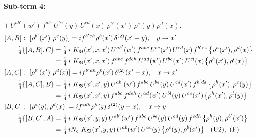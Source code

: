 \documentclass[10pt]{article}
\numberwithin{equation}{section}
\begin{document}
\paragraph{Sub-term 4:} $+\,U^{ab'}(w')\,f^{abc}\,U^{be}(y)\,U^{cd}(x)\,\rho^{b'}(x')\,\rho^{e}(y)\,\rho^{d}(x)$.
\begin{align}
&[A,B]:\ [\rho^{b'}(x'),\rho^{e}(y)]=i f^{b'eh}\rho^{h}(x')\,\delta^{(2)}(x'-y),\quad y\to x'\notag\\
&\qquad \tfrac14\{[A,B],C\}=\tfrac14\,i\,\,K_{\mathfrak B}(x',x,x')\,U^{ab'}(w')\,f^{abc}\,U^{be}(x')\,U^{cd}(x)\,f^{b'eh}\,\big\{\rho^{h}(x'),\rho^{d}(x)\big\}\notag\\
&\qquad\phantom{\tfrac14\{[A,B],C\}}=\tfrac14\,i\,\,K_{\mathfrak B}(x',x,x')\,f^{abc}\,f^{deh}\,U^{ad}(w')\,U^{be}(x')\,U^{cl}(x)\,\big\{\rho^{h}(x'),\rho^{l}(x)\big\}
\label{R:eq:GI.IV-4-AB}\\
&[A,C]:\ [\rho^{b'}(x'),\rho^{d}(x)]=i f^{b'dh}\rho^{h}(x')\,\delta^{(2)}(x'-x),\quad x\to x'\notag\\
&\qquad \tfrac14\{[A,C],B\}=\tfrac14\,i\,\,K_{\mathfrak B}(x',x',y)\,U^{ab'}(w')\,f^{abc}\,U^{be}(y)\,U^{cd}(x')\,f^{b'dh}\,\big\{\rho^{h}(x'),\rho^{e}(y)\big\}\notag\\
&\qquad\phantom{\tfrac14\{[A,C],B\}}=\tfrac14\,i\,\,K_{\mathfrak B}(x',x',y)\,f^{abc}\,f^{deh}\,U^{ad}(w')\,U^{bl}(y)\,U^{ce}(x')\,\big\{\rho^{h}(x'),\rho^{l}(y)\big\}
\label{R:eq:GI.IV-4-AC}\\
&[B,C]:\ [\rho^{e}(y),\rho^{d}(x)]=i f^{edh}\rho^{h}(y)\,\delta^{(2)}(y-x),\quad x\to y\notag\\
&\qquad \tfrac14\{[B,C],A\}=\tfrac14\,i\,\,K_{\mathfrak B}(x',y,y)\,U^{ab'}(w')\,f^{abc}\,U^{be}(y)\,U^{cd}(y)\,f^{edh}\,\big\{\rho^{h}(y),\rho^{b'}(x')\big\}\notag\\
&\qquad\phantom{\tfrac14\{[B,C],A\}}=\tfrac14\,i N_{c}\,\,K_{\mathfrak B}(x',y,y)\,U^{ab}(w')\,U^{ac}(y)\,\big\{\rho^{c}(y),\rho^{b}(x')\big\}\quad\text{(U2)},\ \text{(F)}
\label{R:eq:GI.IV-4-BC}
\end{align}
\end{document}
